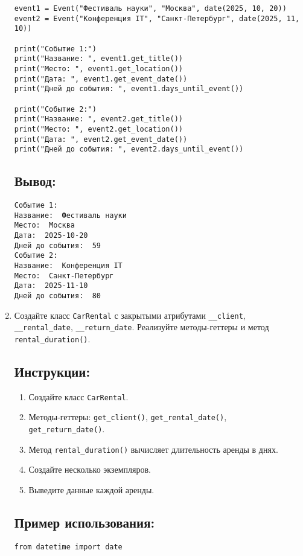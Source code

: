 \begin{enumerate}
\begin{lstlisting}[caption=Пример кода]
event1 = Event("Фестиваль науки", "Москва", date(2025, 10, 20))
event2 = Event("Конференция IT", "Санкт-Петербург", date(2025, 11, 10))

print("Событие 1:")
print("Название: ", event1.get_title())
print("Место: ", event1.get_location())
print("Дата: ", event1.get_event_date())
print("Дней до события: ", event1.days_until_event())

print("Событие 2:")
print("Название: ", event2.get_title())
print("Место: ", event2.get_location())
print("Дата: ", event2.get_event_date())
print("Дней до события: ", event2.days_until_event())
\end{lstlisting}

\subsection*{Вывод:}
\begin{lstlisting}[caption=Ожидаемый вывод]
Событие 1:
Название:  Фестиваль науки
Место:  Москва
Дата:  2025-10-20
Дней до события:  59
Событие 2:
Название:  Конференция IT
Место:  Санкт-Петербург
Дата:  2025-11-10
Дней до события:  80
\end{lstlisting}

\item
Создайте класс \texttt{CarRental} с закрытыми атрибутами \texttt{\_\_client}, \texttt{\_\_rental\_date}, \texttt{\_\_return\_date}. Реализуйте методы-геттеры и метод \texttt{rental\_duration()}.

\subsection*{Инструкции:}
\begin{enumerate}
    \item Создайте класс \texttt{CarRental}.
    \item Методы-геттеры: \texttt{get\_client()}, \texttt{get\_rental\_date()}, \texttt{get\_return\_date()}.
    \item Метод \texttt{rental\_duration()} вычисляет длительность аренды в днях.
    \item Создайте несколько экземпляров.
    \item Выведите данные каждой аренды.
\end{enumerate}

\subsection*{Пример использования:}
\begin{lstlisting}[caption=Пример кода]
from datetime import date


\end{lstlisting}
\end{enumerate}
